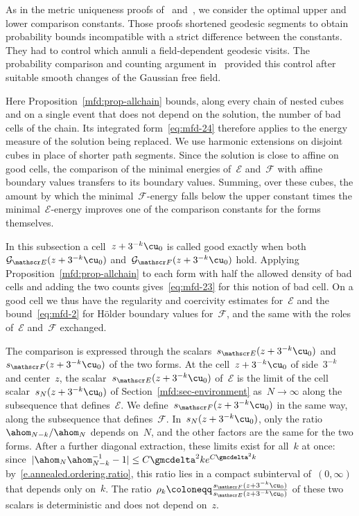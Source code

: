 \documentclass[11pt]{amsart}
\begin{document}
\smallskip

As in the metric uniqueness proofs of~\citet[Section~6]{GM} and~\citet[Section~4.5]{DGUniqueness}, we consider the optimal upper and lower comparison constants. Those proofs shortened geodesic segments to obtain probability bounds incompatible with a strict difference between the constants. They had to control which annuli a field-dependent geodesic visits. The probability comparison and counting argument in~\citet[Section~4.2]{DGUniqueness} provided this control after suitable smooth changes of the Gaussian free field.

\smallskip

Here Proposition~\ref{mfd:prop-allchain} bounds, along every chain of nested cubes and on a single event that does not depend on the solution, the number of bad cells of the chain. Its integrated form~\eqref{eq:mfd-24} therefore applies to the energy measure of the solution being replaced. We use harmonic extensions on disjoint cubes in place of shorter path segments. Since the solution is close to affine on good cells, the comparison of the minimal energies of~$\mathscr E$ and~$\mathscr F$ with affine boundary values transfers to its boundary values. Summing, over these cubes, the amount by which the minimal~$\mathscr F$-energy falls below the upper constant times the minimal~$\mathscr E$-energy improves one of the comparison constants for the forms themselves.

\smallskip

In this subsection a cell~$z+3^{-k}\cu_0$ is called good exactly when both~$\mathcal G_{\mathscr E}(z+3^{-k}\cu_0)$ and~$\mathcal G_{\mathscr F}(z+3^{-k}\cu_0)$ hold. Applying Proposition~\ref{mfd:prop-allchain} to each form with half the allowed density of bad cells and adding the two counts gives~\eqref{eq:mfd-23} for this notion of bad cell. On a good cell we thus have the regularity and coercivity estimates for~$\mathscr E$ and the bound~\eqref{eq:mfd-2} for H\"older boundary values for~$\mathscr F$, and the same with the roles of~$\mathscr E$ and~$\mathscr F$ exchanged.

\smallskip

The comparison is expressed through the scalars~$s_{\mathscr E}(z+3^{-k}\cu_0)$ and~$s_{\mathscr F}(z+3^{-k}\cu_0)$ of the two forms. At the cell~$z+3^{-k}\cu_0$ of side~$3^{-k}$ and center~$z$, the scalar~$s_{\mathscr E}(z+3^{-k}\cu_0)$ of~$\mathscr E$ is the limit of the cell scalar~$s_N(z+3^{-k}\cu_0)$ of Section~\ref{mfd:sec-environment} as~$N\to\infty$ along the subsequence that defines~$\mathscr E$. We define~$s_{\mathscr F}(z+3^{-k}\cu_0)$ in the same way, along the subsequence that defines~$\mathscr F$. In~$s_N(z+3^{-k}\cu_0)$, only the ratio~$\ahom_{N-k}/\ahom_N$ depends on~$N$, and the other factors are the same for the two forms. After a further diagonal extraction, these limits exist for all~$k$ at once: since~$|\ahom_{N}\ahom_{N-k}^{-1}-1|\leq C\gmcdelta^2ke^{C\gmcdelta^2k}$ by~\eqref{e.annealed.ordering.ratio}, this ratio lies in a compact subinterval of~$(0,\infty)$ that depends only on~$k$. The ratio~$\rho_k\coloneqq\frac{s_{\mathscr F}(z+3^{-k}\cu_0)}{s_{\mathscr E}(z+3^{-k}\cu_0)}$ of these two scalars is deterministic and does not depend on~$z$.
\end{document}
